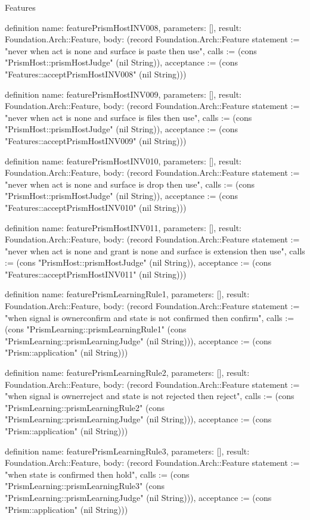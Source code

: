 \begin{lexlean}{Features}
\begin{semanticmodule}
definition{
  name: featurePrismHostINV008,
  parameters: [],
  result: Foundation.Arch::Feature,
  body: (record Foundation.Arch::Feature {statement := "never when act is none and surface is paste then use", calls := (cons "PrismHost::prismHostJudge" (nil String)), acceptance := (cons "Features::acceptPrismHostINV008" (nil String))})
}

definition{
  name: featurePrismHostINV009,
  parameters: [],
  result: Foundation.Arch::Feature,
  body: (record Foundation.Arch::Feature {statement := "never when act is none and surface is files then use", calls := (cons "PrismHost::prismHostJudge" (nil String)), acceptance := (cons "Features::acceptPrismHostINV009" (nil String))})
}

definition{
  name: featurePrismHostINV010,
  parameters: [],
  result: Foundation.Arch::Feature,
  body: (record Foundation.Arch::Feature {statement := "never when act is none and surface is drop then use", calls := (cons "PrismHost::prismHostJudge" (nil String)), acceptance := (cons "Features::acceptPrismHostINV010" (nil String))})
}

definition{
  name: featurePrismHostINV011,
  parameters: [],
  result: Foundation.Arch::Feature,
  body: (record Foundation.Arch::Feature {statement := "never when act is none and grant is none and surface is extension then use", calls := (cons "PrismHost::prismHostJudge" (nil String)), acceptance := (cons "Features::acceptPrismHostINV011" (nil String))})
}

definition{
  name: featurePrismLearningRule1,
  parameters: [],
  result: Foundation.Arch::Feature,
  body: (record Foundation.Arch::Feature {statement := "when signal is ownerconfirm and state is not confirmed then confirm", calls := (cons "PrismLearning::prismLearningRule1" (cons "PrismLearning::prismLearningJudge" (nil String))), acceptance := (cons "Prism::application" (nil String))})
}

definition{
  name: featurePrismLearningRule2,
  parameters: [],
  result: Foundation.Arch::Feature,
  body: (record Foundation.Arch::Feature {statement := "when signal is ownerreject and state is not rejected then reject", calls := (cons "PrismLearning::prismLearningRule2" (cons "PrismLearning::prismLearningJudge" (nil String))), acceptance := (cons "Prism::application" (nil String))})
}

definition{
  name: featurePrismLearningRule3,
  parameters: [],
  result: Foundation.Arch::Feature,
  body: (record Foundation.Arch::Feature {statement := "when state is confirmed then hold", calls := (cons "PrismLearning::prismLearningRule3" (cons "PrismLearning::prismLearningJudge" (nil String))), acceptance := (cons "Prism::application" (nil String))})
}


\end{semanticmodule}
\end{lexlean}
